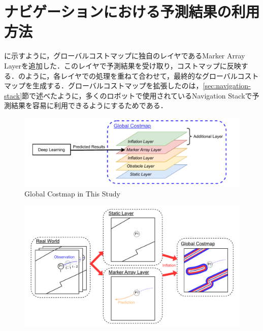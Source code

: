 \section{ナビゲーションにおける予測結果の利用方法}\label{sec:nav-usage}
に示すように，グローバルコストマップに独自のレイヤであるMarker Array Layerを追加した．このレイヤで予測結果を受け取り，コストマップに反映する．のように，各レイヤでの処理を重ねて合わせて，最終的なグローバルコストマップを生成する．グローバルコストマップを拡張したのは，\ref{sec:navigation-stack}節で述べたように，多くのロボットで使用されているNavigation Stackで予測結果を容易に利用できるようにするためである．

\begin{figure}[H]
  \centering
 \includegraphics[keepaspectratio, scale=0.7]
      {images/layer.pdf}
\caption{Global Costmap in This Study}
 \label{Fig:global-costmap}
\end{figure} 

\begin{figure}[H]
  \centering
 \includegraphics[keepaspectratio, scale=0.47]
      {images/costmap-image.pdf}
\caption{}
 \label{Fig:costmap-flow}
\end{figure} 


\newpage
